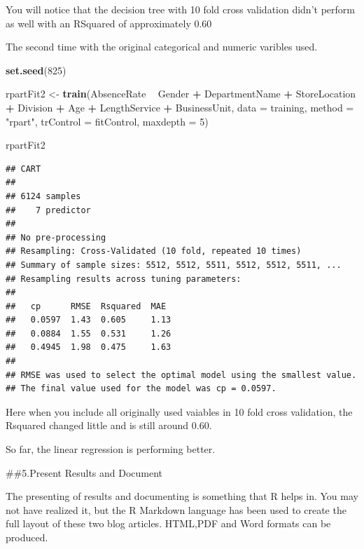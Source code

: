 \documentclass[12pt, krantz2,]{krantz}
\makeatletter
\newenvironment{Shaded}{\begin{snugshade}}{\end{snugshade}}
\newcommand{\DataTypeTok}[1]{\textcolor[rgb]{0.27,0.27,0.27}{#1}}
\newcommand{\DecValTok}[1]{\textcolor[rgb]{0.06,0.06,0.06}{#1}}
\newcommand{\KeywordTok}[1]{\textcolor[rgb]{0.27,0.27,0.27}{\textbf{#1}}}
\newcommand{\NormalTok}[1]{#1}
\newcommand{\OperatorTok}[1]{\textcolor[rgb]{0.43,0.43,0.43}{\textbf{#1}}}
\newcommand{\StringTok}[1]{\textcolor[rgb]{0.5,0.5,0.5}{#1}}
\newenvironment{kframe}{%
\medskip{}
\setlength{\fboxsep}{.8em}
 \def\at@end@of@kframe{}%
 \ifinner\ifhmode%
  \def\at@end@of@kframe{\end{minipage}}%
  \begin{minipage}{\columnwidth}%
 \fi\fi%
 \def\FrameCommand##1{\hskip\@totalleftmargin \hskip-\fboxsep
 \colorbox{shadecolor}{##1}\hskip-\fboxsep
     \hskip-\linewidth \hskip-\@totalleftmargin \hskip\columnwidth}%
 \MakeFramed {\advance\hsize-\width
   \@totalleftmargin\z@ \linewidth\hsize
   \@setminipage}}%
 {\par\unskip\endMakeFramed%
 \at@end@of@kframe}
\renewenvironment{Shaded}{\begin{kframe}}{\end{kframe}}
\makeatother
\begin{document}
You will notice that the decision tree with 10 fold cross validation didn't perform as well with an RSquared of approximately 0.60

The second time with the original categorical and numeric varibles used.

\begin{Shaded}
\begin{Highlighting}[]
\KeywordTok{set.seed}\NormalTok{(}\DecValTok{825}\NormalTok{)}

\NormalTok{rpartFit2 <-}\StringTok{ }\KeywordTok{train}\NormalTok{(AbsenceRate }\OperatorTok{~}\StringTok{ }\NormalTok{Gender }\OperatorTok{+}\StringTok{ }\NormalTok{DepartmentName }\OperatorTok{+}\StringTok{ }\NormalTok{StoreLocation }\OperatorTok{+}\StringTok{ }\NormalTok{Division }\OperatorTok{+}\StringTok{ }\NormalTok{Age }\OperatorTok{+}\StringTok{ }\NormalTok{LengthService }\OperatorTok{+}\StringTok{ }\NormalTok{BusinessUnit, }\DataTypeTok{data =}\NormalTok{ training,}
                 \DataTypeTok{method =} \StringTok{"rpart"}\NormalTok{,}
                 \DataTypeTok{trControl =}\NormalTok{ fitControl,}
                 \DataTypeTok{maxdepth =} \DecValTok{5}\NormalTok{)}

\NormalTok{rpartFit2}
\end{Highlighting}
\end{Shaded}

\begin{verbatim}
## CART 
## 
## 6124 samples
##    7 predictor
## 
## No pre-processing
## Resampling: Cross-Validated (10 fold, repeated 10 times) 
## Summary of sample sizes: 5512, 5512, 5511, 5512, 5512, 5511, ... 
## Resampling results across tuning parameters:
## 
##   cp      RMSE  Rsquared  MAE 
##   0.0597  1.43  0.605     1.13
##   0.0884  1.55  0.531     1.26
##   0.4945  1.98  0.475     1.63
## 
## RMSE was used to select the optimal model using the smallest value.
## The final value used for the model was cp = 0.0597.
\end{verbatim}

Here when you include all originally used vaiables in 10 fold cross validation, the Rsquared changed little and is still around 0.60.

So far, the linear regression is performing better.

\#\#5.Present Results and Document

The presenting of results and documenting is something that R helps in. You may not have realized it, but the R Markdown language has been used to create the full layout of these two blog articles. HTML,PDF and Word formats can be produced.
\end{document}
